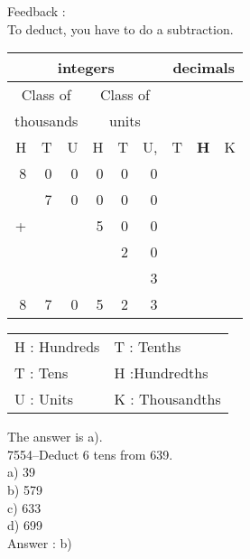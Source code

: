 \documentclass[letterpaper, 12pt]{article}
\begin{document}
Feedback :\\
To deduct, you have to do a subtraction.
\begin{center}
\begin{tabular}{|rrr|rrr|rrr|}
\hline
\multicolumn{6}{|c|}{integers} &\multicolumn{3}{|c|}{decimals} \\
\hline
\multicolumn{3}{|c|}{Class of} &\multicolumn{3}{|c|}{Class of} &  \multicolumn{3}{c|}{} \\
\multicolumn{3}{|c|}{thousands} &\multicolumn{3}{|c|}{units} &  \multicolumn{3}{c|}{} \\
\hline
H & T & U &H & T & U, & T\up{th} & \textbf{H\up{th}} & K\up{th} \\
\hline
\hline
8 & 0 & 0 & 0 & 0 & 0 &  & &\\
 & 7 & 0 & 0 & 0 & 0 &  & &\\
+ &  &  & 5 & 0 & 0 &  & &\\
 &  &  &  & 2 & 0 &  & &\\
 &  &  &  &  & 3 &  & &\\
\hline
\hline
 8 & 7 & 0 & 5 & 2 & 3 &  & &
\\
\hline
\end{tabular}
\end{center}

\scriptsize
\begin{center}
\begin{tabular}{ll}
H : Hundreds & T\up{th} : Tenths\\
T : Tens & H\up{th} :Hundredths\\
U : Units & K\up{e} : Thousandths\\
\end{tabular}
\end{center}

\normalsize
The answer is a).\\





7554--Deduct 6 tens from 639.\\

a) 39\\
b) 579\\
c) 633\\
d) 699\\

Answer : b)\\
\end{document}
